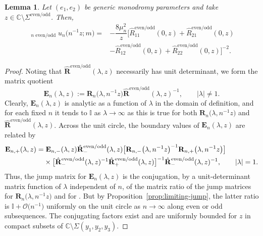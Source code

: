 \documentclass[11pt]{article}
\numberwithin{equation}{section}
\numberwithin{equation}{section}
\newtheorem{Lemma}[Theorem]{Lemma}
\newcommand{\C}{{\mathbb{C}}}
\begin{document}
\begin{Lemma}
\label{lemma:limit}
Let $(e_1, e_2)$ be generic monodromy parameters and take $z \in \C \setminus \Sigma^\mathrm{even/odd}$. Then,
\begin{align}
 \mathop{\lim_{n\to\infty}}_{\text{$n$ even/odd}}u_n\big(n^{-1}z;m\big)={}&-\dfrac{8 \mu_n^2}{z}\big[\hat{R}_{11}^\mathrm{even/odd}(0,z)+\hat{R}_{21}^\mathrm{even/odd}(0,z)\nonumber\\
 &-\hat{R}_{12}^\mathrm{even/odd}(0,z)+\hat{R}_{22}^\mathrm{even/odd}(0,z)\big]^{-2}.\label{eq:un-Rhat}
\end{align}
\end{Lemma}
\begin{proof}

Noting that $\hat{\mathbf{R}}^\mathrm{even/odd}(\lambda,z)$ necessarily has unit determinant, we form the matrix quotient
\begin{equation*}
 \mathbf{E}_n(\lambda,z):=\mathbf{R}_n\big(\lambda,n^{-1}z\big)\hat{\mathbf{R}}^\mathrm{even/odd}(\lambda,z)^{-1},\qquad |\lambda|\neq 1.
\end{equation*}
Clearly, $\mathbf{E}_n(\lambda,z)$ is analytic as a function of $\lambda$ in the domain of definition, and for each fixed $n$ it tends to $\mathbb{I}$ as $\lambda\to\infty$ as this is true for both $\mathbf{R}_n\big(\lambda,n^{-1}z\big)$ and $\hat{\mathbf{R}}^\mathrm{even/odd}(\lambda,z)$. Across the unit circle, the boundary values of $\mathbf{E}_n(\lambda,z)$ are related by
\begin{align*}
 &\mathbf{E}_{n,+}(\lambda,z)= \mathbf{E}_{n,-}(\lambda,z)\hat{\mathbf{R}}_-^\mathrm{even/odd}(\lambda,z)\big[\mathbf{R}_{n,-}\big(\lambda,n^{-1}z\big)^{-1}\mathbf{R}_{n,+}\big(\lambda,n^{-1}z\big)\big]\\
 &\hphantom{\mathbf{E}_{n,+}(\lambda,z)=}{}
 \times \big[\hat{\mathbf{R}}^\mathrm{even/odd}_-(\lambda,z)^{-1}\hat{\mathbf{R}}^\mathrm{even/odd}_+(\lambda,z)\big]^{-1}
 \hat{\mathbf{R}}^\mathrm{even/odd}_-(\lambda,z)^{-1},\qquad |\lambda|=1.
\end{align*}
Thus, the jump matrix for $\mathbf{E}_n(\lambda,z)$ is the conjugation, by a unit-determinant matrix function of $\lambda$ independent of $n$, of the matrix ratio of the jump matrices for $\mathbf{R}_n\big(\lambda,n^{-1}z\big)$ and for . But by Proposition~\ref{prop:limiting-jump}, the latter ratio is $\mathbb{I}+\mathcal{O}\big(n^{-1}\big)$ uniformly on the unit circle as $n\to\infty$ along even or odd subsequences. The conjugating factors exist and are uniformly bounded for $z$ in compact subsets of $\C\setminus \Sigma(y_1, y_2, y_3)$. %

\end{proof}
\end{document}
